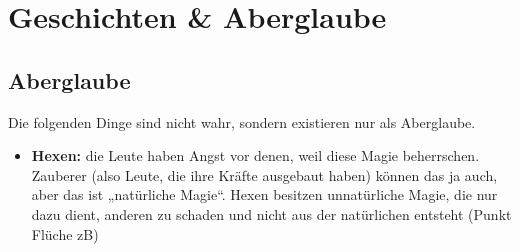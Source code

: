 \section{Geschichten \& Aberglaube}
\subsection{Aberglaube}
Die folgenden Dinge sind nicht wahr, sondern existieren nur als Aberglaube.
\begin{itemize}
	\item \textbf{Hexen:} die Leute haben Angst vor denen, weil diese Magie beherrschen. Zauberer (also Leute, die ihre Kräfte ausgebaut haben) können das ja auch, aber das ist „natürliche Magie“. Hexen besitzen unnatürliche Magie, die nur dazu dient, anderen zu schaden und nicht aus der natürlichen entsteht (Punkt Flüche zB)
\end{itemize}